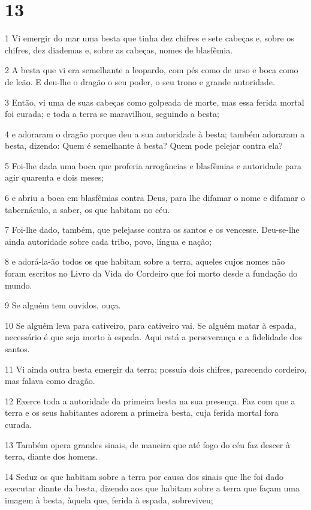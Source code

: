 \chapter{13}

\par 1 Vi emergir do mar uma besta que tinha dez chifres e sete cabeças e, sobre os chifres, dez diademas e, sobre as cabeças, nomes de blasfêmia.
\par 2 A besta que vi era semelhante a leopardo, com pés como de urso e boca como de leão. E deu-lhe o dragão o seu poder, o seu trono e grande autoridade.
\par 3 Então, vi uma de suas cabeças como golpeada de morte, mas essa ferida mortal foi curada; e toda a terra se maravilhou, seguindo a besta;
\par 4 e adoraram o dragão porque deu a sua autoridade à besta; também adoraram a besta, dizendo: Quem é semelhante à besta? Quem pode pelejar contra ela?
\par 5 Foi-lhe dada uma boca que proferia arrogâncias e blasfêmias e autoridade para agir quarenta e dois meses;
\par 6 e abriu a boca em blasfêmias contra Deus, para lhe difamar o nome e difamar o tabernáculo, a saber, os que habitam no céu.
\par 7 Foi-lhe dado, também, que pelejasse contra os santos e os vencesse. Deu-se-lhe ainda autoridade sobre cada tribo, povo, língua e nação;
\par 8 e adorá-la-ão todos os que habitam sobre a terra, aqueles cujos nomes não foram escritos no Livro da Vida do Cordeiro que foi morto desde a fundação do mundo.
\par 9 Se alguém tem ouvidos, ouça.
\par 10 Se alguém leva para cativeiro, para cativeiro vai. Se alguém matar à espada, necessário é que seja morto à espada. Aqui está a perseverança e a fidelidade dos santos.
\par 11 Vi ainda outra besta emergir da terra; possuía dois chifres, parecendo cordeiro, mas falava como dragão.
\par 12 Exerce toda a autoridade da primeira besta na sua presença. Faz com que a terra e os seus habitantes adorem a primeira besta, cuja ferida mortal fora curada.
\par 13 Também opera grandes sinais, de maneira que até fogo do céu faz descer à terra, diante dos homens.
\par 14 Seduz os que habitam sobre a terra por causa dos sinais que lhe foi dado executar diante da besta, dizendo aos que habitam sobre a terra que façam uma imagem à besta, àquela que, ferida à espada, sobreviveu;
